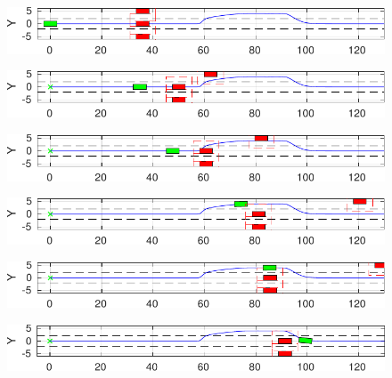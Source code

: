 \documentclass[conference, 11pt]{IEEEtran}
\begin{document}
\begin{figure}[!h]
		\centering
	\begin{minipage}[t]{\columnwidth}
		\includegraphics[width=1\columnwidth]{../../MATLAB/three_obstacles_no_overtaking/figure/braking_0.pdf}
		\label{fig:braking_0}
	\end{minipage}
	\begin{minipage}[t]{\columnwidth}
		\includegraphics[width=1\columnwidth]{../../MATLAB/three_obstacles_no_overtaking/figure/braking_1.pdf}
		\label{fig:braking_1}
	\end{minipage}
	\begin{minipage}[t]{\columnwidth}
		\includegraphics[width=1\columnwidth]{../../MATLAB/three_obstacles_no_overtaking/figure/braking_2.pdf}
		\label{fig:braking_2}
	\end{minipage}
	\begin{minipage}[t]{\columnwidth}
		\includegraphics[width=1\columnwidth]{../../MATLAB/three_obstacles_no_overtaking/figure/braking_3.pdf}
		\label{fig:braking_3}
	\end{minipage}
	\begin{minipage}[t]{\columnwidth}
		\includegraphics[width=1\columnwidth]{../../MATLAB/three_obstacles_no_overtaking/figure/braking_4.pdf}
		\label{fig:braking_4}
	\end{minipage}
	\begin{minipage}[t]{\columnwidth}
		\includegraphics[width=1\columnwidth]{../../MATLAB/three_obstacles_no_overtaking/figure/braking_5.pdf}

\end{minipage}
\end{figure}
\end{document}
